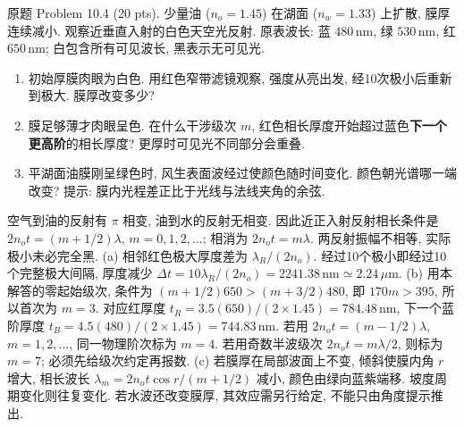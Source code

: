 \begin{exercise}\label{ps:10.4}
原题 Problem 10.4 (20 pts). 少量油 ($n_o=1.45$) 在湖面 ($n_w=1.33$) 上扩散, 膜厚连续减小. 观察近垂直入射的白色天空光反射. 原表波长: 蓝 $480\,\mathrm{nm}$, 绿 $530\,\mathrm{nm}$, 红 $650\,\mathrm{nm}$; 白包含所有可见波长, 黑表示无可见光.
\begin{enumerate}[label=\alph*.]
\item 初始厚膜肉眼为白色. 用红色窄带滤镜观察, 强度从亮出发, 经10次极小后重新到极大. 膜厚改变多少?
\item 膜足够薄才肉眼呈色. 在什么干涉级次 $m$, 红色相长厚度开始超过蓝色\textbf{下一个更高阶}的相长厚度? 更厚时可见光不同部分会重叠.
\item 平湖面油膜刚呈绿色时, 风生表面波经过使颜色随时间变化. 颜色朝光谱哪一端改变? 提示: 膜内光程差正比于光线与法线夹角的余弦.
\end{enumerate}
\end{exercise}
\begin{solution}
空气到油的反射有 $\pi$ 相变, 油到水的反射无相变. 因此近正入射反射相长条件是
$2n_ot=(m+1/2)\lambda$, $m=0,1,2,\ldots$; 相消为 $2n_ot=m\lambda$. 两反射振幅不相等, 实际极小未必完全黑.
(a) 相邻红色极大厚度差为 $\lambda_R/(2n_o)$. 经过10个极小即经过10个完整极大间隔, 厚度减少
$\Delta t=10\lambda_R/(2n_o)=2241.38\,\mathrm{nm}\simeq2.24\,\mu\mathrm m$.
(b) 用本解答的零起始级次, 条件为
$(m+1/2)650>(m+3/2)480$, 即 $170m>395$, 所以首次为 $m=3$.
对应红厚度 $t_R=3.5(650)/(2\times1.45)=784.48\,\mathrm{nm}$, 下一个蓝阶厚度 $t_B=4.5(480)/(2\times1.45)=744.83\,\mathrm{nm}$. 若用 $2n_ot=(m-1/2)\lambda$, $m=1,2,\ldots$, 同一物理阶次标为 $m=4$. 若用奇数半波级次 $2n_ot=m\lambda/2$, 则标为 $m=7$; 必须先给级次约定再报数.
(c) 若膜厚在局部波面上不变, 倾斜使膜内角 $r$ 增大, 相长波长
$\lambda_m=2n_ot\cos r/(m+1/2)$ 减小, 颜色由绿向蓝紫端移. 坡度周期变化则往复变化. 若水波还改变膜厚, 其效应需另行给定, 不能只由角度提示推出.
\end{solution}

